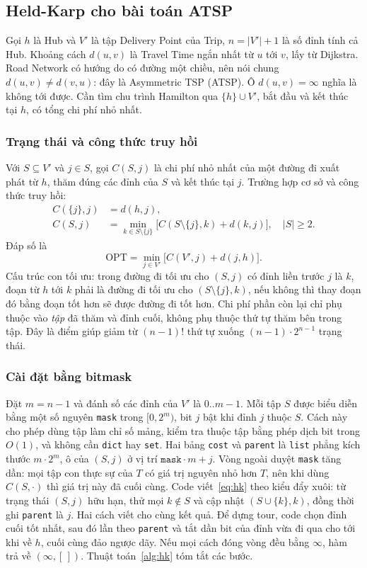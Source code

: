 \subsection{Held-Karp cho bài toán ATSP}

Gọi $h$ là Hub và $V'$ là tập Delivery Point của Trip, $n = |V'| + 1$ là số đỉnh tính cả Hub. Khoảng cách $d(u, v)$ là Travel Time ngắn nhất từ $u$ tới $v$, lấy từ Dijkstra. Road Network có hướng do có đường một chiều, nên nói chung $d(u, v) \ne d(v, u)$: đây là Asymmetric TSP (ATSP). Ô $d(u,v) = \infty$ nghĩa là không tới được. Cần tìm chu trình Hamilton qua $\{h\} \cup V'$, bắt đầu và kết thúc tại $h$, có tổng chi phí nhỏ nhất.

\subsubsection{Trạng thái và công thức truy hồi}
Với $S \subseteq V'$ và $j \in S$, gọi $C(S, j)$ là chi phí nhỏ nhất của một đường đi xuất phát từ $h$, thăm đúng các đỉnh của $S$ và kết thúc tại $j$. Trường hợp cơ sở và công thức truy hồi:
\begin{align}
C(\{j\}, j) &= d(h, j),\\
C(S, j) &= \min_{k \in S \setminus \{j\}} \bigl[C(S \setminus \{j\}, k) + d(k, j)\bigr], \quad |S| \ge 2. \label{eq:hk}
\end{align}
Đáp số là
\begin{equation}
\mathrm{OPT} = \min_{j \in V'} \bigl[C(V', j) + d(j, h)\bigr].
\end{equation}
Cấu trúc con tối ưu: trong đường đi tối ưu cho $(S, j)$ có đỉnh liền trước $j$ là $k$, đoạn từ $h$ tới $k$ phải là đường đi tối ưu cho $(S \setminus \{j\}, k)$, nếu không thì thay đoạn đó bằng đoạn tốt hơn sẽ được đường đi tốt hơn. Chi phí phần còn lại chỉ phụ thuộc vào \emph{tập} đã thăm và đỉnh cuối, không phụ thuộc thứ tự thăm bên trong tập. Đây là điểm giúp giảm từ $(n-1)!$ thứ tự xuống $(n-1) \cdot 2^{n-1}$ trạng thái.

\subsubsection{Cài đặt bằng bitmask}
Đặt $m = n - 1$ và đánh số các đỉnh của $V'$ là $0..m-1$. Mỗi tập $S$ được biểu diễn bằng một số nguyên \texttt{mask} trong $[0, 2^m)$, bit $j$ bật khi đỉnh $j$ thuộc $S$. Cách này cho phép dùng tập làm chỉ số mảng, kiểm tra thuộc tập bằng phép dịch bit trong $O(1)$, và không cần \texttt{dict} hay \texttt{set}. Hai bảng \texttt{cost} và \texttt{parent} là \texttt{list} phẳng kích thước $m \cdot 2^m$, ô của $(S, j)$ ở vị trí $\texttt{mask}\cdot m + j$. Vòng ngoài duyệt \texttt{mask} tăng dần: mọi tập con thực sự của $T$ có giá trị nguyên nhỏ hơn $T$, nên khi dùng $C(S, \cdot)$ thì giá trị này đã cuối cùng. Code viết~\eqref{eq:hk} theo kiểu đẩy xuôi: từ trạng thái $(S, j)$ hữu hạn, thử mọi $k \notin S$ và cập nhật $(S \cup \{k\}, k)$, đồng thời ghi \texttt{parent} là $j$. Hai cách viết cho cùng kết quả. Để dựng tour, code chọn đỉnh cuối tốt nhất, sau đó lần theo \texttt{parent} và tắt dần bit của đỉnh vừa đi qua cho tới khi về $h$, cuối cùng đảo ngược dãy. Nếu mọi cách đóng vòng đều bằng $\infty$, hàm trả về $(\infty, [\,])$. Thuật toán~\ref{alg:hk} tóm tắt các bước.

